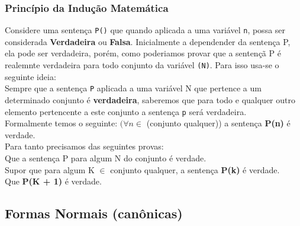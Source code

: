 \documentclass[12pt, onecolumn]{article}
\begin{document}
	\subsubsection{\centering Princípio da Indução Matemática}
	
	Considere uma sentença \texttt{P()} que quando aplicada a uma variável 
	\texttt{n}, possa ser considerada \textbf{Verdadeira} ou \textbf{Falsa}.
	Inicialmente a dependender da sentença P, ela pode ser verdadeira, porém,
	como poderiamos provar que a sentençã P é realemnte verdadeira para todo
	conjunto da variável \texttt{(N)}. Para isso usa-se o seguinte ideia:\\
	\newline
	Sempre que a sentença \texttt{P} aplicada a uma variável N que pertence a um
	determinado conjunto é \textbf{verdadeira}, saberemos que para todo
	e qualquer outro elemento pertencente a este conjunto a sentença \texttt{p}
	será verdadeira.\\
	\newline
	Formalmente temos o seguinte: $(\forall n \in$ (conjunto qualquer))
	a sentença \textbf{P(n)} é verdade. \\
	\newline
	Para tanto precisamos das seguintes provas: \\
	\newline
	Que a sentença P para algum N do conjunto é verdade.\\
	\newline
	Supor que para algum K $\in$ conjunto qualquer, 
	a sentença \textbf{P(k)} é verdade.\\
	\newline
	Que \textbf{P(K + 1)} é verdade.

	\subsection{\centering Formas Normais (canônicas)}
	
\end{document}
